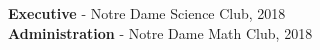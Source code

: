 

 \textbf{Executive} - Notre Dame Science Club, 2018 \\
 \vspace{1mm}
 \textbf{Administration} - Notre Dame Math Club, 2018 \\